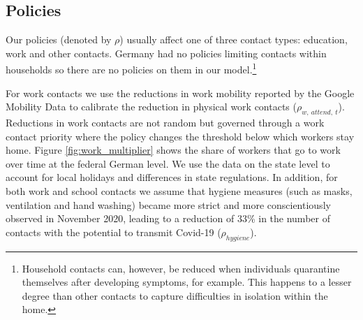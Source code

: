 \subsection{Policies}
\label{subsec:policies}

Our policies (denoted by $\rho$) usually affect one of three contact types: education,
work and other contacts.
Germany had no policies limiting contacts within households so there are no policies on
them in our model.\footnote{Household contacts can, however, be reduced when individuals
quarantine themselves after developing symptoms, for example. This happens to a lesser
degree than other contacts to capture difficulties in isolation within the home.}



For work contacts we use the reductions in work mobility reported by the Google Mobility
Data \citep{Google2021} to calibrate the reduction in physical work contacts
($\rho_{w,\:attend,\:t}$). Reductions in work contacts are not random but governed
through a work contact priority where the policy changes the threshold below which
workers stay home. Figure \ref{fig:work_multiplier} shows the share of workers that go to
work over time at the federal German level. We use the data on the state level to account
for local holidays and differences in state regulations.
In addition, for both work and school contacts we assume that hygiene measures (such as
masks, ventilation and hand washing) became more strict and more conscientiously observed
in November 2020, leading to a reduction of 33\% in the number of contacts with the potential
to transmit Covid-19 ($\rho_{hygiene}$).


